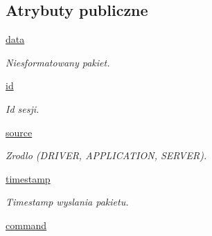 \subsection*{Atrybuty publiczne}
\begin{DoxyCompactItemize}
\item 
\hypertarget{class_serv_1_1_packet_1_1_packet_a5c1fb13da3486f574c94aaac06f3c56c}{
\hyperlink{class_serv_1_1_packet_1_1_packet_a5c1fb13da3486f574c94aaac06f3c56c}{data}}
\label{class_serv_1_1_packet_1_1_packet_a5c1fb13da3486f574c94aaac06f3c56c}

\begin{DoxyCompactList}\small\item\em Niesformatowany pakiet. \item\end{DoxyCompactList}\item 
\hypertarget{class_serv_1_1_packet_1_1_packet_a5cc00710f6a12b310f6b69d88ed51c55}{
\hyperlink{class_serv_1_1_packet_1_1_packet_a5cc00710f6a12b310f6b69d88ed51c55}{id}}
\label{class_serv_1_1_packet_1_1_packet_a5cc00710f6a12b310f6b69d88ed51c55}

\begin{DoxyCompactList}\small\item\em Id sesji. \item\end{DoxyCompactList}\item 
\hypertarget{class_serv_1_1_packet_1_1_packet_a37864cf9c1e11502ff340f0068ffa7f9}{
\hyperlink{class_serv_1_1_packet_1_1_packet_a37864cf9c1e11502ff340f0068ffa7f9}{source}}
\label{class_serv_1_1_packet_1_1_packet_a37864cf9c1e11502ff340f0068ffa7f9}

\begin{DoxyCompactList}\small\item\em Zrodlo (DRIVER, APPLICATION, SERVER). \item\end{DoxyCompactList}\item 
\hypertarget{class_serv_1_1_packet_1_1_packet_af7df973d840761ea9884fdffd800dc27}{
\hyperlink{class_serv_1_1_packet_1_1_packet_af7df973d840761ea9884fdffd800dc27}{timestamp}}
\label{class_serv_1_1_packet_1_1_packet_af7df973d840761ea9884fdffd800dc27}

\begin{DoxyCompactList}\small\item\em Timestamp wyslania pakietu. \item\end{DoxyCompactList}\item 
\hypertarget{class_serv_1_1_packet_1_1_packet_a8a1139cb536fdc04312e50fbeb8e95a0}{
\hyperlink{class_serv_1_1_packet_1_1_packet_a8a1139cb536fdc04312e50fbeb8e95a0}{command}}
\label{class_serv_1_1_packet_1_1_packet_a8a1139cb536fdc04312e50fbeb8e95a0}


\end{DoxyCompactItemize}
